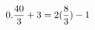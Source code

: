 \documentclass[preview]{standalone}
\begin{document}
\begin{align*}
\special{dvisvgm:raw <g id='unique000'>}0.\frac{40}{3} + 3 = 2(\frac{8}{3}) - 1\special{dvisvgm:raw </g>}
\end{align*}
\end{document}
